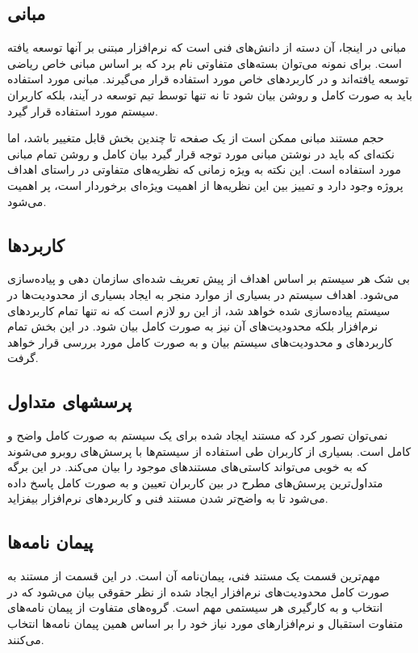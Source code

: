 \subsection{مبانی}

مبانی در اینجا، آن دسته از دانش‌های فنی است که نرم‌افزار مبتنی بر آنها توسعه یافته است.
برای نمونه می‌توان بسته‌های متفاوتی نام برد که بر اساس مبانی خاص ریاضی توسعه یافته‌اند
و در کاربردهای خاص مورد استفاده قرار می‌گیرند. مبانی مورد استفاده باید به صورت کامل و روشن
بیان شود تا نه تنها توسط تیم توسعه در آیند، بلکه کاربران سیستم مورد استفاده قرار گیرد.

حجم مستند مبانی ممکن است از یک صفحه تا چندین بخش قابل متغییر باشد، اما نکته‌ای که باید در نوشتن
مبانی مورد توجه قرار گیرد بیان کامل و روشن تمام مبانی مورد استفاده است. این نکته به ویژه زمانی
که نظریه‌های متفاوتی در راستای اهداف پروژه وجود دارد و تمییز بین این نظریه‌ها از اهمیت
ویژه‌ای برخوردار است، پر اهمیت می‌شود.
  
\subsection{کاربردها}
بی شک هر سیستم بر اساس اهداف از پیش تعریف شده‌ای سازمان دهی و پیاده‌سازی می‌شود. اهداف سیستم 
در بسیاری از موارد منجر به ایجاد بسیاری از محدودیت‌ها در سیستم پیاده‌سازی شده خواهد شد، از این
رو لازم است که نه تنها تمام کاربردهای نرم‌افزار بلکه محدودیت‌های آن نیز به صورت کامل بیان شود.
در این بخش تمام کاربردهای و محدودیت‌های سیستم بیان و به صورت کامل مورد بررسی قرار خواهد گرفت.
  
\subsection{پرسشهای متداول}
نمی‌توان تصور کرد که مستند ایجاد شده برای یک سیستم به صورت کامل واضح و کامل است. بسیاری از کاربران
طی استفاده از سیستم‌ها با پرسش‌های روبرو می‌شوند که به خوبی می‌تواند کاستی‌های مستندهای موجود را بیان 
می‌کند. در این برگه متداول‌ترین پرسش‌های مطرح در بین کاربران تعیین و به صورت کامل پاسخ داده می‌شود
تا به واضح‌تر شدن مستند فنی و کاربردهای نرم‌افزار بیفزاید.
  
\subsection{پیمان نامه‌ها}
مهم‌ترین قسمت یک مستند فنی، پیمان‌نامه آن است. در این قسمت از مستند به صورت کامل محدودیت‌های نرم‌افزار
ایجاد شده از نظر حقوقی بیان می‌شود که در انتخاب و به کارگیری هر سیستمی مهم است. گروه‌های متفاوت
از پیمان نامه‌های متفاوت استقبال و نرم‌افزارهای مورد نیاز خود را بر اساس همین پیمان نامه‌ها 
انتخاب می‌کنند.
  

